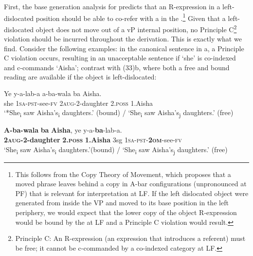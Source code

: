 \documentclass[output=paper,newtxmath,modfonts,nonflat,hidelinks]{langsci/langscibook}
\begin{document}
{First, the base generation analysis for  predicts that an \linebreak R-expression in a left-dislocated position should be able to co-refer with a  in the .}\footnote{This follows from the Copy Theory of Movement, which proposes that a moved phrase leaves behind a copy in A-bar  configurations (unpronounced at PF) that is relevant for interpretation at LF. If the left dislocated object were generated from inside the VP and moved to its base position in the left periphery, we would expect that the lower copy of the object R-expression would be bound by the  at LF and a Principle C violation would result.} {Given that a left-dislocated object does not move out of a} v{P internal position, no Principle C}\footnote{Principle C: An R-expression (an expression that introduces a referent) must be free; it cannot be c-commanded by a co-indexed category at LF.} {violation should be incurred throughout the derivation. This is exactly what we find. Consider the following examples: in the canonical sentence in a, a Principle C violation occurs, resulting in an unacceptable sentence if ‘she’ is co-indexed and c-commands ‘Aisha’; contrast with (33)b, where both a free and bound reading are available if the object is left-dislocated:}


\ea\label{ex:ranero:33}
\ea\label{ex:ranero:33a}
\gll Ye  y-a-lab-a           a-ba-wala      ba        Aisha.\\
she \textsc{1sa-pst}{}-see\textsc{{}-fv} 2\textsc{aug}{}-2-daughter 2.\textsc{poss} 1.Aisha\\
\glt ‘*She\textsubscript{i} saw Aisha’s\textsubscript{i} daughters.’ (bound) / ‘She\textsubscript{i} saw Aisha’s\textsubscript{j} daughters.’ (free)

\ex\label{ex:ranero:33b}
\gll \textbf{A-ba-wala} \textbf{ba}        \textbf{Aisha},   ye   y-a-\textbf{ba}{}-lab-a.\\
\textbf{2\textsc{aug}}\textbf{{}-2-daughter} \textbf{2.}\textbf{\textsc{poss}} \textbf{1.Aisha} 3sg \textsc{1sa-pst-}\textbf{\textsc{2om}}{}-see-\textsc{fv}\\
\glt ‘She\textsubscript{i} saw Aisha’s\textsubscript{i} daughters.’(bound) / ‘She\textsubscript{i} saw Aisha’s\textsubscript{j} daughters.’ (free)
\z
\z
\end{document}
